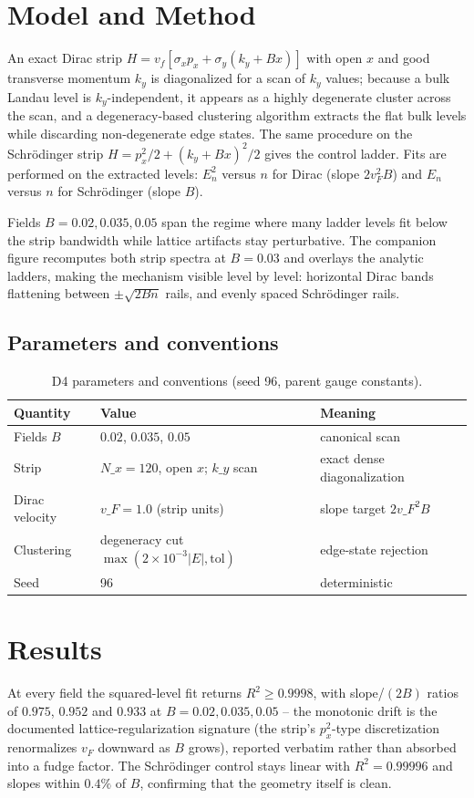 \documentclass[11pt,a4paper]{article}
\begin{document}
\section{Model and Method}
An exact Dirac strip $H = v_f[\sigma_x p_x + \sigma_y (k_y + Bx)]$ with open $x$ and good transverse momentum $k_y$ is diagonalized for a scan of $k_y$ values; because a bulk Landau level is $k_y$-independent, it appears as a highly degenerate cluster across the scan, and a degeneracy-based clustering algorithm extracts the flat bulk levels while discarding non-degenerate edge states. The same procedure on the Schrödinger strip $H = p_x^2/2 + (k_y + Bx)^2/2$ gives the control ladder. Fits are performed on the extracted levels: $E_n^2$ versus $n$ for Dirac (slope $2v_F^2B$) and $E_n$ versus $n$ for Schrödinger (slope $B$).

Fields $B = 0.02, 0.035, 0.05$ span the regime where many ladder levels fit below the strip bandwidth while lattice artifacts stay perturbative. The companion figure recomputes both strip spectra at $B = 0.03$ and overlays the analytic ladders, making the mechanism visible level by level: horizontal Dirac bands flattening between $\pm\sqrt{2Bn}$ rails, and evenly spaced Schrödinger rails.

\subsection{Parameters and conventions}
\begin{table}[htbp]\centering\small
\begin{tabularx}{\columnwidth}{@{}l l X@{}}
\toprule
Quantity & Value & Meaning \\
\midrule
Fields $B$ & $0.02$, $0.035$, $0.05$ & canonical scan \\
Strip & $N\_x = 120$, open $x$; $k\_y$ scan & exact dense diagonalization \\
Dirac velocity & $v\_F = 1.0$ (strip units) & slope target $2v\_F^2B$ \\
Clustering & degeneracy cut $\max(2\times10^{-3}|E|, \mathrm{tol})$ & edge-state rejection \\
Seed & 96 & deterministic \\
\bottomrule
\end{tabularx}
\caption{D4 parameters and conventions (seed 96, parent gauge constants).}
\end{table}

\section{Results}
At every field the squared-level fit returns $R^2 \geq 0.9998$, with slope/$(2B)$ ratios of $0.975$, $0.952$ and $0.933$ at $B = 0.02, 0.035, 0.05$ -- the monotonic drift is the documented lattice-regularization signature (the strip's $p_x^2$-type discretization renormalizes $v_F$ downward as $B$ grows), reported verbatim rather than absorbed into a fudge factor. The Schrödinger control stays linear with $R^2 = 0.99996$ and slopes within $0.4\%$ of $B$, confirming that the geometry itself is clean.
\end{document}
